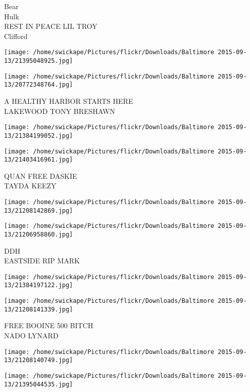 \documentclass[10pt,letterpaper]{article}
\begin{document}
Bear\\
Hulk\\
REST IN PEACE LIL TROY\\
Clifford\\
\pagebreak

\texttt{[image: /home/swickape/Pictures/flickr/Downloads/Baltimore 2015-09-13/21395048925.jpg]}

\vspace{0.25in}
\texttt{[image: /home/swickape/Pictures/flickr/Downloads/Baltimore 2015-09-13/20772348764.jpg]}

A HEALTHY HARBOR STARTS HERE\\
LAKEWOOD TONY BRESHAWN\\
\pagebreak

\texttt{[image: /home/swickape/Pictures/flickr/Downloads/Baltimore 2015-09-13/21384199052.jpg]}

\vspace{0.25in}
\texttt{[image: /home/swickape/Pictures/flickr/Downloads/Baltimore 2015-09-13/21403416961.jpg]}

QUAN FREE DASKIE\\
TAYDA KEEZY\\
\pagebreak

\texttt{[image: /home/swickape/Pictures/flickr/Downloads/Baltimore 2015-09-13/21208142869.jpg]}

\vspace{0.25in}
\texttt{[image: /home/swickape/Pictures/flickr/Downloads/Baltimore 2015-09-13/21206958860.jpg]}

DDH\\
EASTSIDE RIP MARK\\
\pagebreak

\texttt{[image: /home/swickape/Pictures/flickr/Downloads/Baltimore 2015-09-13/21384197122.jpg]}

\vspace{0.25in}
\texttt{[image: /home/swickape/Pictures/flickr/Downloads/Baltimore 2015-09-13/21208141339.jpg]}

FREE BOOINE 500 BITCH\\
NADO LYNARD\\
\pagebreak

\texttt{[image: /home/swickape/Pictures/flickr/Downloads/Baltimore 2015-09-13/21208140749.jpg]}

\vspace{0.25in}
\texttt{[image: /home/swickape/Pictures/flickr/Downloads/Baltimore 2015-09-13/21395044535.jpg]}
\end{document}

